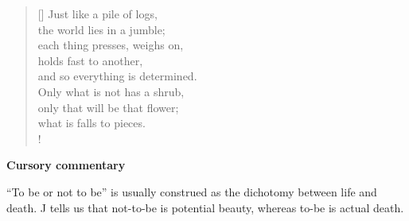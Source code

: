 \documentclass[a4paper,12pt,twoside,final]{book}
\begin{document}
\newpage


\settowidth{\versewidth}{each thing constricts, presses against,}

\begin{verse}[\versewidth]
  Just like a pile of logs, \\
  the world lies in a jumble; \\
  each thing presses, weighs on, \\
  holds fast to another, \\
  and so everything is determined. \\
  Only what is not has a shrub, \\
  only that will be that flower; \\
  what is falls to pieces. \\!
\end{verse}


\bigskip

\noindent \textbf{Cursory commentary}

\medskip

``To be or not to be'' is usually construed as the dichotomy between
life and death. J tells us that not-to-be is potential beauty, whereas
to-be is actual death.

\newpage

\settowidth{\versewidth}{Csak ami nincs, annak van bokra,}
\end{document}

